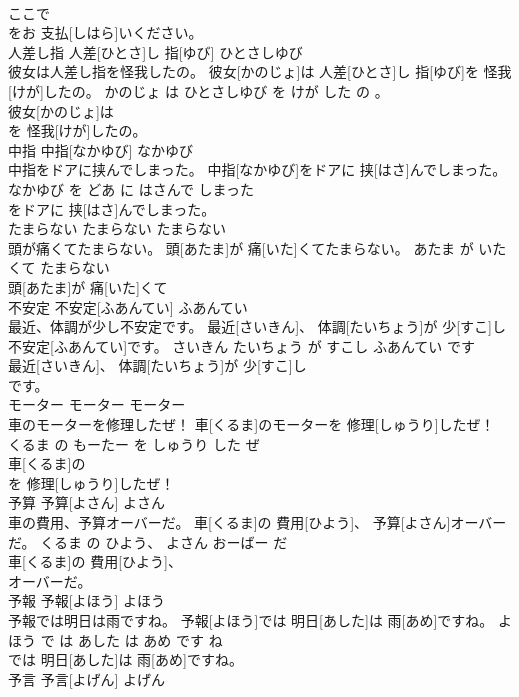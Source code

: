 \documentclass[8pt]{extreport}
\begin{document}
\begin{CJK}{UTF8}{min}
\\	ここで
\\	をお 支払[しはら]いください。			
\\	人差し指	人差[ひとさ]し 指[ゆび]	ひとさしゆび	
\\	彼女は人差し指を怪我したの。	彼女[かのじょ]は 人差[ひとさ]し 指[ゆび]を 怪我[けが]したの。	かのじょ は ひとさしゆび を けが した の 。	
\\	彼女[かのじょ]は
\\	を 怪我[けが]したの。			
\\	中指	中指[なかゆび]	なかゆび	
\\	中指をドアに挟んでしまった。	中指[なかゆび]をドアに 挟[はさ]んでしまった。	なかゆび を どあ に はさんで しまった	
\\	をドアに 挟[はさ]んでしまった。			
\\	たまらない	たまらない	たまらない	
\\	頭が痛くてたまらない。	頭[あたま]が 痛[いた]くてたまらない。	あたま が いたくて たまらない	
\\	頭[あたま]が 痛[いた]くて
\\	不安定	不安定[ふあんてい]	ふあんてい	
\\	最近、体調が少し不安定です。	最近[さいきん]、 体調[たいちょう]が 少[すこ]し 不安定[ふあんてい]です。	さいきん たいちょう が すこし ふあんてい です	
\\	最近[さいきん]、 体調[たいちょう]が 少[すこ]し
\\	です。			
\\	モーター	モーター	モーター	
\\	車のモーターを修理したぜ！	車[くるま]のモーターを 修理[しゅうり]したぜ！	くるま の もーたー を しゅうり した ぜ	
\\	車[くるま]の
\\	を 修理[しゅうり]したぜ！			
\\	予算	予算[よさん]	よさん	
\\	車の費用、予算オーバーだ。	車[くるま]の 費用[ひよう]、 予算[よさん]オーバーだ。	くるま の ひよう、 よさん おーばー だ	
\\	車[くるま]の 費用[ひよう]、
\\	オーバーだ。			
\\	予報	予報[よほう]	よほう	
\\	予報では明日は雨ですね。	予報[よほう]では 明日[あした]は 雨[あめ]ですね。	よほう で は あした は あめ です ね	
\\	では 明日[あした]は 雨[あめ]ですね。			
\\	予言	予言[よげん]	よげん	

\end{CJK}
\end{document}
